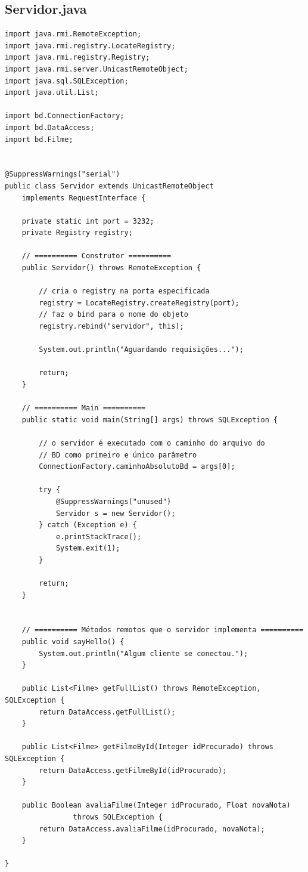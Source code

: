 \documentclass[11pt,twoside]{article}
\begin{document}
\subsection{Servidor.java}       %
\begin{verbatim}
import java.rmi.RemoteException;
import java.rmi.registry.LocateRegistry;
import java.rmi.registry.Registry;
import java.rmi.server.UnicastRemoteObject;
import java.sql.SQLException;
import java.util.List;

import bd.ConnectionFactory;
import bd.DataAccess;
import bd.Filme;


@SuppressWarnings("serial")
public class Servidor extends UnicastRemoteObject 
	implements RequestInterface {

	private static int port = 3232;
	private Registry registry;

	// ========== Construtor ==========
	public Servidor() throws RemoteException {

		// cria o registry na porta especificada
		registry = LocateRegistry.createRegistry(port);
		// faz o bind para o nome do objeto
		registry.rebind("servidor", this);
		
		System.out.println("Aguardando requisições...");
		
		return;
	}
	
	// ========== Main ==========
	public static void main(String[] args) throws SQLException {

		// o servidor é executado com o caminho do arquivo do
		// BD como primeiro e único parâmetro
		ConnectionFactory.caminhoAbsolutoBd = args[0];

		try {
			@SuppressWarnings("unused")
			Servidor s = new Servidor();
		} catch (Exception e) {
			e.printStackTrace();
			System.exit(1);
		}
	
		return;
	}
	
	
	// ========== Métodos remotos que o servidor implementa ==========
	public void sayHello() {
		System.out.println("Algum cliente se conectou.");
	}

	public List<Filme> getFullList() throws RemoteException, SQLException {
		return DataAccess.getFullList();
	}
	
	public List<Filme> getFilmeById(Integer idProcurado) throws SQLException {
		return DataAccess.getFilmeById(idProcurado);
	}

	public Boolean avaliaFilme(Integer idProcurado, Float novaNota) 
                throws SQLException {
		return DataAccess.avaliaFilme(idProcurado, novaNota);
	}

}
\end{verbatim}
\end{document}
